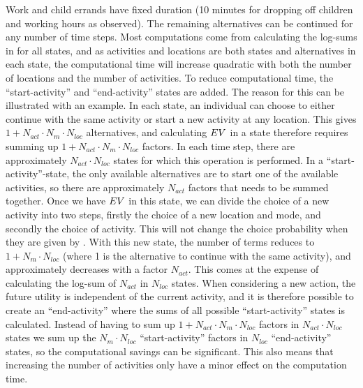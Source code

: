 Work and child errands have fixed duration (10 minutes for dropping off children and working hours as observed). The remaining alternatives can be continued for any number of time steps. Most computations come from calculating the log-sums in  for all states, and as activities and locations are both states and alternatives in each state, the computational time will increase quadratic with both the number of locations and the number of activities. To reduce computational time, the ``start-activity'' and ``end-activity'' states are added. The reason for this can be illustrated with an example. In each state, an individual can choose to either continue with the same activity or start a new activity at any location. This gives $1 + N_{act}\cdot N_{m}\cdot N_{loc}$ alternatives, and calculating $EV$ in a state therefore requires summing up $1 + N_{act}\cdot N_{m}\cdot N_{loc}$ factors. In each time step, there are approximately $N_{act}\cdot N_{loc}$ states for which this operation is performed. In a ``start-activity''-state, the only available alternatives are to start one of the available activities, so there are approximately $N_{act}$ factors that needs to be summed together. Once we have $EV$ in this state, we can divide the choice of a new activity into two steps, firstly the choice of a new location and mode, and secondly the choice of activity. This will not change the choice probability when they are given by . With this new state, the number of terms reduces to $1 + N_{m}\cdot N_{loc}$ (where 1 is the alternative to continue with the same activity), and approximately decreases with a factor $N_{act}$. This comes at the expense of calculating the log-sum of $N_{act}$ in $N_{loc}$ states. When considering a new action, the future utility is independent of the current activity, and it is therefore possible to create an ``end-activity'' where the sums of all possible ``start-activity'' states is calculated. Instead of having to sum up $1 + N_{act}\cdot N_{m}\cdot N_{loc}$ factors in $N_{act}\cdot N_{loc}$ states we sum up the $N_{m}\cdot N_{loc}$ ``start-activity'' factors in $N_{loc}$ ``end-activity'' states, so the computational savings can be significant. This also means that increasing the number of activities only have a minor effect on the computation time.